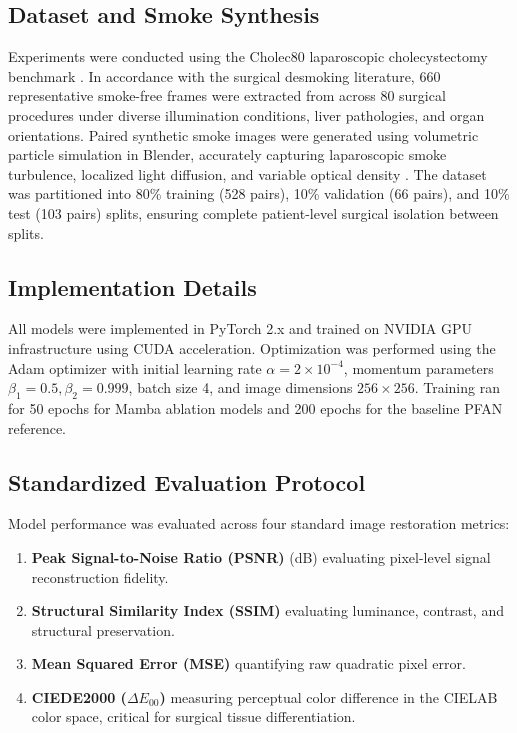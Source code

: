 \documentclass[conference]{IEEEtran}
\begin{document}
\subsection{Dataset and Smoke Synthesis}
Experiments were conducted using the Cholec80 laparoscopic cholecystectomy benchmark \cite{twinanda2017endonet}. In accordance with the surgical desmoking literature, 660 representative smoke-free frames were extracted from across 80 surgical procedures under diverse illumination conditions, liver pathologies, and organ orientations. Paired synthetic smoke images were generated using volumetric particle simulation in Blender, accurately capturing laparoscopic smoke turbulence, localized light diffusion, and variable optical density \cite{bolkar2018, pfan2024}. The dataset was partitioned into 80\% training (528 pairs), 10\% validation (66 pairs), and 10\% test (103 pairs) splits, ensuring complete patient-level surgical isolation between splits.

\subsection{Implementation Details}
All models were implemented in PyTorch 2.x and trained on NVIDIA GPU infrastructure using CUDA acceleration. Optimization was performed using the Adam optimizer with initial learning rate $\alpha = 2 \times 10^{-4}$, momentum parameters $\beta_1 = 0.5, \beta_2 = 0.999$, batch size 4, and image dimensions $256 \times 256$. Training ran for 50 epochs for Mamba ablation models and 200 epochs for the baseline PFAN reference.

\subsection{Standardized Evaluation Protocol}
Model performance was evaluated across four standard image restoration metrics:
\begin{enumerate}
    \item \textbf{Peak Signal-to-Noise Ratio (PSNR)} (dB) evaluating pixel-level signal reconstruction fidelity.
    \item \textbf{Structural Similarity Index (SSIM)} evaluating luminance, contrast, and structural preservation.
    \item \textbf{Mean Squared Error (MSE)} quantifying raw quadratic pixel error.
    \item \textbf{CIEDE2000 ($\Delta E_{00}$)} \cite{luo2001ciede2000} measuring perceptual color difference in the CIELAB color space, critical for surgical tissue differentiation.
\end{enumerate}
\end{document}

